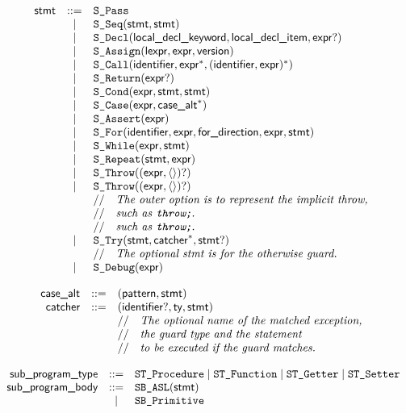 \documentclass{book}
\begin{document}
\[
\begin{array}{rcl}
\textsf{stmt} &::=& \texttt{S\_Pass}\\
  &|& \texttt{S\_Seq}(\textsf{stmt}, \textsf{stmt})\\
  &|& \texttt{S\_Decl}(\textsf{local\_decl\_keyword}, \textsf{local\_decl\_item}, \textsf{expr}?)\\
  &|& \texttt{S\_Assign}(\textsf{lexpr}, \textsf{expr}, \textsf{version})\\
  &|& \texttt{S\_Call}(\textsf{identifier}, \textsf{expr}^*, (\textsf{identifier}, \textsf{expr})^*)\\
  &|& \texttt{S\_Return}(\textsf{expr}?)\\
  &|& \texttt{S\_Cond}(\textsf{expr}, \textsf{stmt}, \textsf{stmt})\\
  &|& \texttt{S\_Case}(\textsf{expr}, \textsf{case\_alt}^*)\\
  &|& \texttt{S\_Assert}(\textsf{expr})\\
  &|& \texttt{S\_For}(\textsf{identifier}, \textsf{expr}, \textsf{for\_direction}, \textsf{expr}, \textsf{stmt})\\
  &|& \texttt{S\_While}(\textsf{expr}, \textsf{stmt})\\
  &|& \texttt{S\_Repeat}(\textsf{stmt}, \textsf{expr})\\
  &|& \texttt{S\_Throw}((\textsf{expr}, \langle\rangle)?)\\
  &|& \texttt{S\_Throw}((\textsf{expr}, \langle\rangle)?)\\
  & & //\quad\textit{The outer option is to represent the implicit throw,}\ \\
  & & //\quad\textit{such as \texttt{throw;}.}\ \\
  & & //\quad\textit{such as \texttt{throw;}.}\ \\
  &|& \texttt{S\_Try}(\textsf{stmt}, \textsf{catcher}^*, \textsf{stmt}?)\\
  & & //\quad\textit{The optional stmt is for the otherwise guard.}\ \\
  &|& \texttt{S\_Debug}(\textsf{expr})
\end{array}
\]

\[
\begin{array}{rcl}
\textsf{case\_alt} &::=& (\textsf{pattern}, \textsf{stmt})\\
\textsf{catcher} &::=& (\textsf{identifier}?, \textsf{ty}, \textsf{stmt})\\
  & & //\quad\textit{The optional name of the matched exception,}\ \\
  & & //\quad\textit{the guard type and the statement}\ \\
  & & //\quad\textit{to be executed if the guard matches.}\ \\
\end{array}
\]

\[
\begin{array}{rcl}
\textsf{sub\_program\_type} &::=& \texttt{ST\_Procedure} \;|\; \texttt{ST\_Function} \;|\; \texttt{ST\_Getter} \;|\; \texttt{ST\_Setter}\\
\textsf{sub\_program\_body} &::=& \texttt{SB\_ASL}(\textsf{stmt})\\
  &|& \texttt{SB\_Primitive}\\
\end{array}
\]
\end{document}
